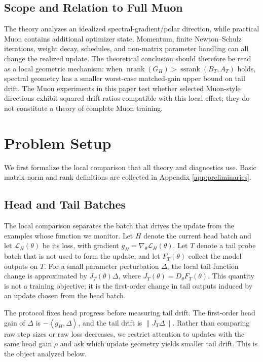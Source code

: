 \documentclass{article}
\theoremstyle{definition}
\newcommand{\Loss}{\mathcal L}
\newcommand{\norm}[1]{\left\lVert #1 \right\rVert}
\newcommand{\inner}[2]{\left\langle #1,#2 \right\rangle}
\newcommand{\nrank}{\operatorname{nrank}}
\newcommand{\ssrank}{\operatorname{ssrank}}
\begin{document}
\subsection{Scope and Relation to Full Muon}

The theory analyzes an idealized spectral-gradient/polar direction, while practical Muon contains additional optimizer state. Momentum, finite Newton--Schulz iterations, weight decay, schedules, and non-matrix parameter handling can all change the realized update. The theoretical conclusion should therefore be read as a local geometric mechanism: when \(\nrank(G_H)>\ssrank(B_T,A_T)\) holds, spectral geometry has a smaller worst-case matched-gain upper bound on tail drift. The Muon experiments in this paper test whether selected Muon-style directions exhibit squared drift ratios compatible with this local effect; they do not constitute a theory of complete Muon training.

\section{Problem Setup}

We first formalize the local comparison that all theory and diagnostics use. Basic matrix-norm and rank definitions are collected in Appendix \ref{app:preliminaries}.

\subsection{Head and Tail Batches}

The local comparison separates the batch that drives the update from the examples whose function we monitor. Let \(H\) denote the current head batch and let \(\Loss_H(\theta)\) be its loss, with gradient \(g_H=\nabla_\theta \Loss_H(\theta)\). Let \(T\) denote a tail probe batch that is not used to form the update, and let \(F_T(\theta)\) collect the model outputs on \(T\). For a small parameter perturbation \(\Delta\), the local tail-function change is approximated by \(J_T(\theta)\Delta\), where \(J_T(\theta)=D_\theta F_T(\theta)\). This quantity is not a training objective; it is the first-order change in tail outputs induced by an update chosen from the head batch.

The protocol fixes head progress before measuring tail drift. The first-order head gain of \(\Delta\) is \(-\inner{g_H}{\Delta}\), and the tail drift is \(\norm{J_T\Delta}\). Rather than comparing raw step sizes or raw loss decreases, we restrict attention to updates with the same head gain \(\rho\) and ask which update geometry yields smaller tail drift. This is the object analyzed below.
\end{document}
